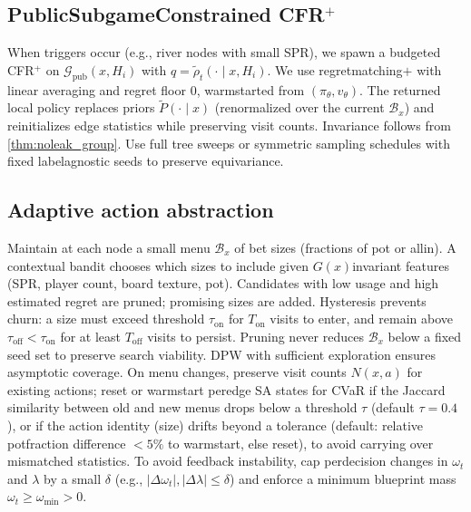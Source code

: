 \documentclass[10pt]{article}
\newcommand{\1}{\mathbf{1}}
\theoremstyle{plain}
\begin{document}
\subsection{Public\textendash Subgame\textendash Constrained CFR$^+$}
When triggers occur (e.g., river nodes with small SPR), we spawn a budgeted CFR$^+$ on $\mathcal{G}_{\text{pub}}(x,H_i)$ with $q=\tilde\rho_t(\cdot\mid x,H_i)$. We use regret\textendash matching$+$ with linear averaging and regret floor $0$, warm\textendash started from $(\pi_\theta,v_\theta)$. The returned local policy replaces priors $\tilde P(\cdot\mid x)$ (renormalized over the current $\mathcal{B}_x$) and reinitializes edge statistics while preserving visit counts. Invariance follows from \cref{thm:noleak_group}. Use full tree sweeps or symmetric sampling schedules with fixed label\textendash agnostic seeds to preserve equivariance.

\subsection{Adaptive action abstraction}
\label{sec:adaptive_abstraction}
Maintain at each node a small menu $\mathcal{B}_x$ of bet sizes (fractions of pot or all\textendash in). A contextual bandit chooses which sizes to include given $G(x)$\textendash invariant features (SPR, player count, board texture, pot). Candidates with low usage and high estimated regret are pruned; promising sizes are added. Hysteresis prevents churn: a size must exceed threshold $\tau_{\text{on}}$ for $T_{\text{on}}$ visits to enter, and remain above $\tau_{\text{off}}<\tau_{\text{on}}$ for at least $T_{\text{off}}$ visits to persist. Pruning never reduces $\mathcal{B}_x$ below a fixed seed set to preserve search viability. DPW with sufficient exploration ensures asymptotic coverage. On menu changes, preserve visit counts $N(x,a)$ for existing actions; reset or warm\textendash start per\textendash edge SA states for CVaR if the Jaccard similarity between old and new menus drops below a threshold $\tau$ (default $\tau=0.4$), or if the action identity (size) drifts beyond a tolerance (default: relative pot\textendash fraction difference $<5\%$ to warm\textendash start, else reset), to avoid carrying over mismatched statistics. To avoid feedback instability, cap per\textendash decision changes in $\omega_t$ and $\lambda$ by a small $\delta$ (e.g., $|\Delta \omega_t|,|\Delta \lambda|\le \delta$) and enforce a minimum blueprint mass $\omega_t\ge \omega_{\min}>0$.
\end{document}
